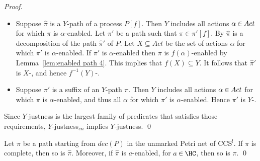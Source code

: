 \documentclass[smallcondensed]{svjour3}
\newcommand{\Lem}[1]{Lemma~\ref{lem:#1}}
\begin{document}
\begin{proof}
\begin{itemize}
  \item Suppose $\widehat\pi$ is a $Y\!$-\ejust path of a process $P[f]$.
  Then $Y$ includes all actions $\alpha\mathbin\in Act$ for which $\pi$ is $\alpha$-enabled.
  Let $\pi'$ be a path such that $\pi\in \pi'[f]$.
  By  $\widehat \pi$ is a decomposition of the path $\widehat\pi'$ of $P$.
  Let $X \subseteq Act$ be the set of actions $\alpha$ for which $\pi'$ is $\alpha$-enabled.
  If $\pi'$ is $\alpha$-enabled then $\pi$ is $f(\alpha)$-enabled by \Lem{enabled path 4}.
  This implies that $f(X) \subseteq Y$.
  It follows that $\widehat\pi'$ is $X$-\ejustn, and hence $f^{-1}(Y)$-\ejustn.

  \item Suppose $\pi'$ is a suffix of an $Y\!$-\ejust path $\pi$.
  Then $Y$ includes all actions $\alpha\mathbin\in Act$ for which $\pi$ is $\alpha$-enabled, and
  thus all $\alpha$ for which $\pi'$ is $\alpha$-enabled. Hence $\pi'$ is $Y\!$-\ejustn.
  \end{itemize}
  Since $Y\!$-justness is the largest family of
  predicates that satisfies those requirements, $Y\!$-justness${}_{en}$ implies $Y\!$-justness.
\qed\end{proof}

\begin{corollary}\label{cor:enabling transfer}
Let $\pi$ be a path starting from $dec(P)$ in the unmarked Petri net of CCS$^!$.
If $\pi$ is complete, then so is $\widehat\pi$.
Moreover, if $\widehat\pi$ is $a$-enabled, for $a\mathbin\in\HC$, then so is $\pi$.
\qed
\end{corollary}
\end{document}
